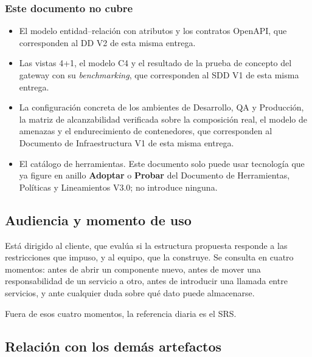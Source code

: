 \documentclass[11pt,a4paper]{article}
\newcommand{\adoptar}{\textcolor{ringAdoptar}{\textbf{Adoptar}}}
\newcommand{\probar}{\textcolor{ringProbar}{\textbf{Probar}}}
\begin{document}
\subsubsection*{Este documento no cubre}

\begin{itemize}
\item El modelo entidad--relación con atributos y los contratos OpenAPI, que corresponden al DD V2 de esta misma entrega.
\item Las vistas 4+1, el modelo C4 y el resultado de la prueba de concepto del gateway con su \emph{benchmarking}, que corresponden al SDD V1 de esta misma entrega.
\item La configuración concreta de los ambientes de Desarrollo, QA y Producción, la matriz de alcanzabilidad verificada sobre la composición real, el modelo de amenazas y el endurecimiento de contenedores, que corresponden al Documento de Infraestructura V1 de esta misma entrega.
\item El catálogo de herramientas. Este documento solo puede usar tecnología que ya figure en anillo \adoptar{} o \probar{} del Documento de Herramientas, Políticas y Lineamientos V3.0; no introduce ninguna.
\end{itemize}

\subsection{Audiencia y momento de uso}

Está dirigido al cliente, que evalúa si la estructura propuesta responde a las restricciones que impuso, y al equipo, que la construye. Se consulta en cuatro momentos: antes de abrir un componente nuevo, antes de mover una responsabilidad de un servicio a otro, antes de introducir una llamada entre servicios, y ante cualquier duda sobre qué dato puede almacenarse.

Fuera de esos cuatro momentos, la referencia diaria es el SRS.

\subsection{Relación con los demás artefactos}
\end{document}
